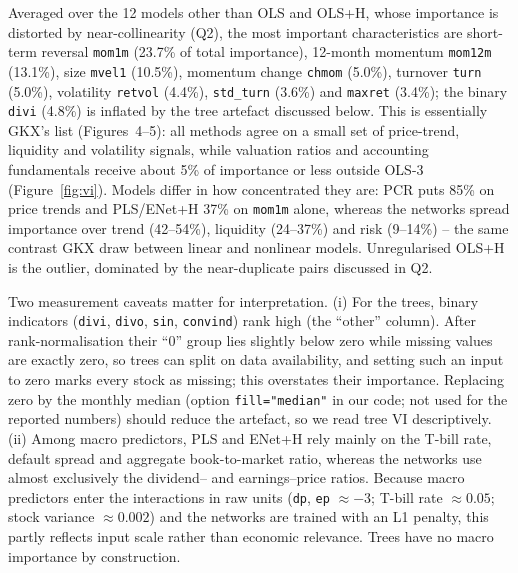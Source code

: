\documentclass[10pt]{article}
\begin{document}
Averaged over the 12 models other than OLS and OLS+H, whose importance is distorted by near-collinearity (Q2), the most
important characteristics are short-term reversal \texttt{mom1m} (23.7\% of total importance), 12-month momentum
\texttt{mom12m} (13.1\%), size \texttt{mvel1} (10.5\%), momentum change \texttt{chmom} (5.0\%), turnover \texttt{turn} (5.0\%),
volatility \texttt{retvol} (4.4\%), \texttt{std\_turn} (3.6\%) and \texttt{maxret} (3.4\%); the binary \texttt{divi} (4.8\%)
is inflated by the tree artefact discussed below. This
is essentially GKX's list (Figures~4--5): all methods agree on a small set of price-trend, liquidity and volatility signals,
while valuation ratios and accounting fundamentals receive about 5\% of importance or less outside OLS-3 (Figure~\ref{fig:vi}).
Models differ in how concentrated they are: PCR puts 85\% on price trends and PLS/ENet+H 37\% on \texttt{mom1m} alone,
whereas the networks spread importance over trend (42--54\%), liquidity (24--37\%) and risk (9--14\%) -- the same contrast
GKX draw between linear and nonlinear models. Unregularised OLS+H is the outlier, dominated by the near-duplicate pairs
discussed in Q2.

Two measurement caveats matter for interpretation. (i) For the trees, binary indicators (\texttt{divi}, \texttt{divo},
\texttt{sin}, \texttt{convind}) rank high (the ``other'' column). After rank-normalisation their ``0'' group lies slightly
below zero while missing values are exactly zero, so trees can split on data availability, and setting such an input to zero
marks every stock as missing; this overstates their importance. Replacing zero by the monthly median (option
\texttt{fill="median"} in our code; not used for the reported numbers) should reduce the artefact, so we read tree VI
descriptively. (ii) Among macro predictors, PLS and ENet+H rely mainly on the T-bill rate,
default spread and aggregate book-to-market ratio, whereas the networks use almost exclusively the dividend-- and
earnings--price ratios. Because macro predictors enter the interactions in raw units (\texttt{dp}, \texttt{ep} $\approx-3$;
T-bill rate $\approx0.05$; stock variance $\approx0.002$) and the networks are trained with an L1 penalty, this partly
reflects input scale rather than economic relevance. Trees have no macro importance by construction.
\end{document}
